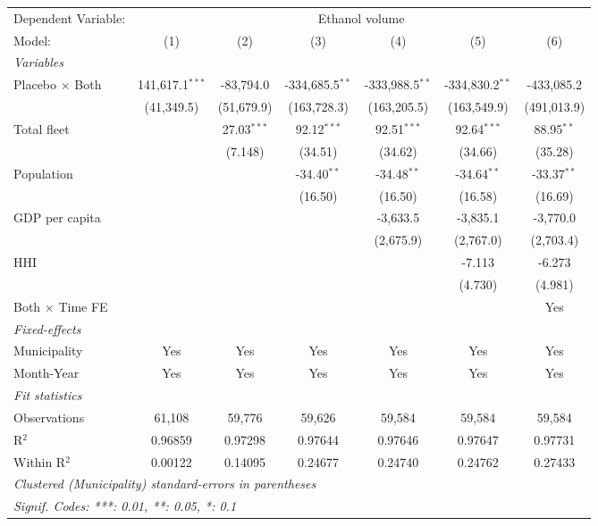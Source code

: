 \documentclass[
]{article}
\begin{document}
\begin{tabular}{lcccccc}
\tabularnewline\midrule\midrule
Dependent Variable:&\multicolumn{6}{c}{Ethanol volume}\\
Model:&(1) & (2) & (3) & (4) & (5) & (6)\\
\midrule \emph{Variables}&   &   &   &   &   &  \\
Placebo $\times $ Both & 141,617.1$^{***}$ & -83,794.0 & -334,685.5$^{**}$ & -333,988.5$^{**}$ & -334,830.2$^{**}$ & -433,085.2\\
  &(41,349.5) & (51,679.9) & (163,728.3) & (163,205.5) & (163,549.9) & (491,013.9)\\
Total fleet &    & 27.03$^{***}$ & 92.12$^{***}$ & 92.51$^{***}$ & 92.64$^{***}$ & 88.95$^{**}$\\
  &   & (7.148) & (34.51) & (34.62) & (34.66) & (35.28)\\
Population &    &    & -34.40$^{**}$ & -34.48$^{**}$ & -34.64$^{**}$ & -33.37$^{**}$\\
  &   &    & (16.50) & (16.50) & (16.58) & (16.69)\\
GDP per capita &    &    &    & -3,633.5 & -3,835.1 & -3,770.0\\
  &   &    &    & (2,675.9) & (2,767.0) & (2,703.4)\\
HHI &    &    &    &    & -7.113 & -6.273\\
  &   &    &    &    & (4.730) & (4.981)\\
Both $\times$ Time FE &  &  &  &  &  & Yes\\
\midrule \emph{Fixed-effects}&   &   &   &   &   &  \\
Municipality & Yes & Yes & Yes & Yes & Yes & Yes\\
Month-Year & Yes & Yes & Yes & Yes & Yes & Yes\\
\midrule \emph{Fit statistics}&  & & & & & \\
Observations & 61,108&59,776&59,626&59,584&59,584&59,584\\
R$^2$ & 0.96859&0.97298&0.97644&0.97646&0.97647&0.97731\\
Within R$^2$ & 0.00122&0.14095&0.24677&0.24740&0.24762&0.27433\\
\midrule\midrule\multicolumn{7}{l}{\emph{Clustered (Municipality) standard-errors in parentheses}}\\
\multicolumn{7}{l}{\emph{Signif. Codes: ***: 0.01, **: 0.05, *: 0.1}}\\
\end{tabular}
\end{document}
